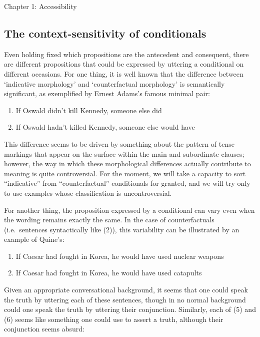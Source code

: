 Chapter 1: Accessibility

\subsection{The context-sensitivity of
conditionals}\label{the-context-sensitivity-of-conditionals}

Even holding fixed which propositions are the antecedent and consequent,
there are different propositions that could be expressed by uttering a
conditional on different occasions. For one thing, it is well known that
the difference between `indicative morphology' and `counterfactual
morphology' is semantically significant, as exemplified by Ernest
Adams's famous minimal pair:

\begin{enumerate}
\def\labelenumi{(\arabic{enumi})}
\item
  If Oswald didn't kill Kennedy, someone else did
\item
  If Oswald hadn't killed Kennedy, someone else would have
\end{enumerate}

This difference seems to be driven by something about the pattern of
tense markings that appear on the surface within the main and
subordinate clauses; however, the way in which these morphological
differences actually contribute to meaning is quite controversial. For
the moment, we will take a capacity to sort ``indicative'' from
``counterfactual'' conditionals for granted, and we will try only to use
examples whose classification is uncontroversial.

For another thing, the proposition expressed by a conditional can vary
even when the wording remains exactly the same. In the case of
counterfactuals (i.e.~sentences syntactically like (2)), this
variability can be illustrated by an example of Quine's:

\begin{enumerate}
\def\labelenumi{(\arabic{enumi})}
\setcounter{enumi}{2}
\item
  If Caesar had fought in Korea, he would have used nuclear weapons
\item
  If Caesar had fought in Korea, he would have used catapults
\end{enumerate}

Given an appropriate conversational background, it seems that one could
speak the truth by uttering each of these sentences, though in no normal
background could one speak the truth by uttering their conjunction.
Similarly, each of (5) and (6) seems like something one could use to
assert a truth, although their conjunction seems absurd:

